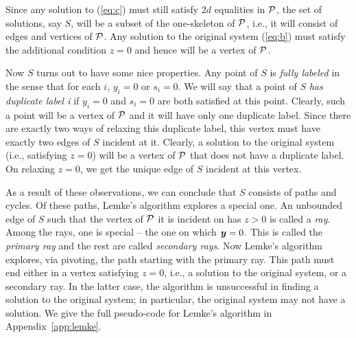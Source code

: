 Since any solution to (\ref{eq:c}) must still satisfy $2d$ equalities in $\mbox{${\mathcal P}$}$, the set of solutions, say
$S$, will be a subset of the one-skeleton of $\mbox{${\mathcal P}$}$, i.e., it will consist of edges and vertices of $\mbox{${\mathcal P}$}$.  Any solution to
the original system (\ref{eq:b}) must satisfy the additional condition $z = 0$ and hence will be a vertex of $\mbox{${\mathcal P}$}$.



Now $S$ turns out to have some nice properties. Any point of $S$ is {\em fully labeled} in the sense that for each $i$, $y_i
= 0$ or $s_i = 0$.  We will say that a point of $S$ {\em has duplicate label i} if $y_i = 0$ and $s_i = 0$ are both satisfied
at this point. Clearly, such a point will be a vertex of $\mbox{${\mathcal P}$}$ and it will have only one duplicate label.  Since there are
exactly two ways of relaxing this duplicate label, this vertex must have exactly two edges of $S$ incident at it.  Clearly, a
solution to the original system (i.e., satisfying $z = 0$) will be a vertex of $\mbox{${\mathcal P}$}$ that does not have a duplicate label.  On
relaxing $z=0$, we get the unique edge of $S$ incident at this vertex.

As a result of these observations, we can conclude that $S$ consists of paths and cycles.  Of these paths, Lemke's algorithm
explores a special one.  An unbounded edge of $S$ such that the vertex of $\mbox{${\mathcal P}$}$ it is incident on has $z > 0$ is called a
{\em ray}.  Among the rays, one is special -- the one on which $\mbox{\boldmath $y$} = 0$. This is called the {\em primary ray} and the rest
are called {\em secondary rays}. Now Lemke's algorithm explores, via pivoting, the path starting with the primary ray. This
path must end either in a vertex satisfying $z = 0$, i.e., a solution to the original system, or a secondary ray. In the
latter case, the algorithm is unsuccessful in finding a solution to the original system; in particular, the original system
may not have a solution.  
We give the full pseudo-code for Lemke's algorithm in Appendix~\ref{app:lemke}.



